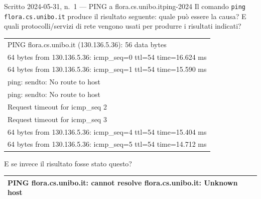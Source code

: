 \documentclass{report}
\begin{document}
\begin{Exercise}{Scritto 2024-05-31, n.\ 1 --- PING a flora.cs.unibo.it}{ping-2024}
Il comando \texttt{ping flora.cs.unibo.it} produce il risultato seguente: quale
può essere la causa? E quali protocolli/servizi di rete vengono usati per produrre
i risultati indicati?
\begin{center}
\ttfamily\footnotesize
\begin{tabular}{@{}l@{}}
\hline
PING flora.cs.unibo.it (130.136.5.36): 56 data bytes \\
64 bytes from 130.136.5.36: icmp\_seq=0 ttl=54 time=16.624 ms \\
64 bytes from 130.136.5.36: icmp\_seq=1 ttl=54 time=15.590 ms \\
ping: sendto: No route to host \\
ping: sendto: No route to host \\
Request timeout for icmp\_seq 2 \\
Request timeout for icmp\_seq 3 \\
64 bytes from 130.136.5.36: icmp\_seq=4 ttl=54 time=15.404 ms \\
64 bytes from 130.136.5.36: icmp\_seq=5 ttl=54 time=14.712 ms \\
\hline
\end{tabular}
\end{center}
E se invece il risultato fosse stato questo?
\begin{center}
\ttfamily\footnotesize
\begin{tabular}{@{}l@{}}
\hline
PING flora.cs.unibo.it: cannot resolve flora.cs.unibo.it: Unknown host \\
\hline
\end{tabular}
\end{center}
\end{Exercise}
\end{document}
